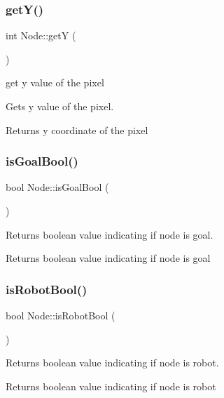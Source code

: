 \subsubsection{\texorpdfstring{get\+Y()}{getY()}}
{\footnotesize\ttfamily int Node\+::getY (\begin{DoxyParamCaption}{ }\end{DoxyParamCaption})}



get y value of the pixel 

Gets y value of the pixel.

\begin{DoxyReturn}{Returns}
y coordinate of the pixel 
\end{DoxyReturn}
\mbox{\label{classNode_afcaad545bd834248566eca68c9375fbc}} 
\subsubsection{\texorpdfstring{is\+Goal\+Bool()}{isGoalBool()}}
{\footnotesize\ttfamily bool Node\+::is\+Goal\+Bool (\begin{DoxyParamCaption}{ }\end{DoxyParamCaption})}



Returns boolean value indicating if node is goal. 

\begin{DoxyReturn}{Returns}
boolean value indicating if node is goal 
\end{DoxyReturn}
\mbox{\label{classNode_ac74fc548dd704ffba0d2d2498d75c04d}} 
\subsubsection{\texorpdfstring{is\+Robot\+Bool()}{isRobotBool()}}
{\footnotesize\ttfamily bool Node\+::is\+Robot\+Bool (\begin{DoxyParamCaption}{ }\end{DoxyParamCaption})}



Returns boolean value indicating if node is robot. 

\begin{DoxyReturn}{Returns}
boolean value indicating if node is robot 
\end{DoxyReturn}
\mbox{\label{classNode_af9e1787d05908b711d23c37b970fcc5f}} 

